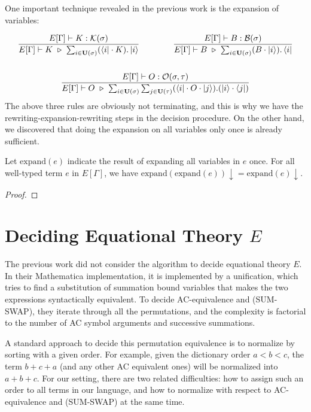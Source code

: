 \documentclass[runningheads]{llncs}
\begin{document}
One important technique revealed in the previous work is the expansion of variables:

\begin{gather*}
    \frac{E[\Gamma] \vdash K : \KType(\sigma)}{E[\Gamma] \vdash K \ \reduce\ \sum_{i \in \mathbf{U}(\sigma)}(\bra{i}\cdot K).\ket{i}}
    \qquad \qquad
    \frac{E[\Gamma] \vdash B : \BType(\sigma)}{E[\Gamma] \vdash B \ \reduce\ \sum_{i \in \mathbf{U}(\sigma)}(B \cdot \ket{i}).\bra{i}} \\
    \\
    \frac{E[\Gamma] \vdash O : \OType(\sigma, \tau)}{E[\Gamma] \vdash O \ \reduce\ \sum_{i \in \mathbf{U}(\sigma)} \sum_{j \in \mathbf{U}(\tau)}(\bra{i} \cdot O \cdot \ket{j}).(\ket{i} \cdot \bra{j})}
\end{gather*}
The above three rules are obviously not terminating, and this is why we have the rewriting-expansion-rewriting steps in the decision procedure. On the other hand, we discovered that doing the expansion on all variables only once is already sufficient.

\begin{lemma}
    Let $\text{expand}(e)$ indicate the result of expanding all variables in $e$ once.
    For all well-typed term $e$ in $E[\Gamma]$, we have $\text{expand}(\text{expand}(e)) \downarrow = \text{expand}(e)\downarrow$.
\end{lemma}
\begin{proof}
\end{proof}



\section{Deciding Equational Theory $E$}

The previous work did not consider the algorithm to decide equational theory $E$. In their Mathematica implementation, it is implemented by a unification, which tries to find a substitution of summation bound variables that makes the two expressions syntactically equivalent. To decide AC-equivalence and (SUM-SWAP), they iterate through all the permutations, and the complexity is factorial to the number of AC symbol arguments and successive summations.

A standard approach to decide this permutation equivalence is to normalize by sorting with a given order. For example, given the dictionary order $a < b < c$, the term $b + c + a$ (and any other AC equivalent ones) will be normalized into $a + b + c$. For our setting, there are two related difficulties: how to assign such an order to all terms in our language, and how to normalize with respect to AC-equivalence and (SUM-SWAP) at the same time.
\end{document}
